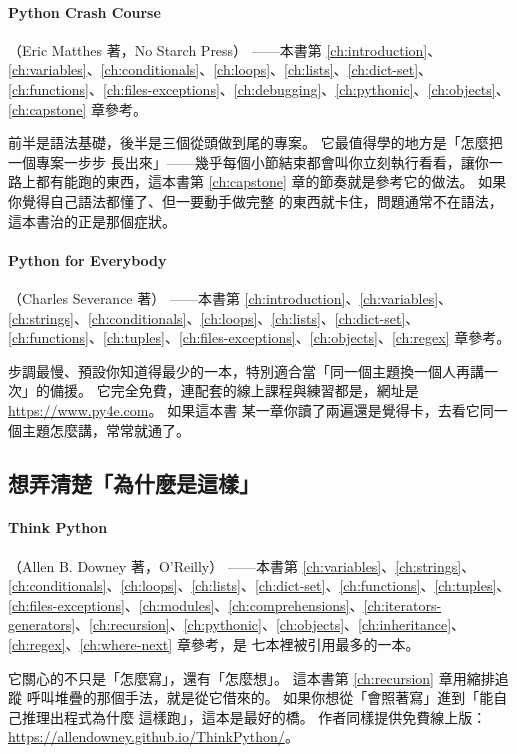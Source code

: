 \paragraph{Python Crash Course}（Eric Matthes 著，No Starch Press）
——本書第 \ref{ch:introduction}、\ref{ch:variables}、\ref{ch:conditionals}、\ref{ch:loops}、\ref{ch:lists}、\ref{ch:dict-set}、\ref{ch:functions}、\ref{ch:files-exceptions}、\ref{ch:debugging}、\ref{ch:pythonic}、\ref{ch:objects}、\ref{ch:capstone} 章參考。

前半是語法基礎，後半是三個從頭做到尾的專案。 它最值得學的地方是「怎麼把一個專案一步步
長出來」——幾乎每個小節結束都會叫你立刻執行看看，讓你一路上都有能跑的東西，這本書第
\ref{ch:capstone} 章的節奏就是參考它的做法。 如果你覺得自己語法都懂了、但一要動手做完整
的東西就卡住，問題通常不在語法，這本書治的正是那個症狀。

\paragraph{Python for Everybody}（Charles Severance 著）
——本書第 \ref{ch:introduction}、\ref{ch:variables}、\ref{ch:strings}、\ref{ch:conditionals}、\ref{ch:loops}、\ref{ch:lists}、\ref{ch:dict-set}、\ref{ch:functions}、\ref{ch:tuples}、\ref{ch:files-exceptions}、\ref{ch:objects}、\ref{ch:regex} 章參考。

步調最慢、預設你知道得最少的一本，特別適合當「同一個主題換一個人再講一次」的備援。
它完全免費，連配套的線上課程與練習都是，網址是 \url{https://www.py4e.com}。 如果這本書
某一章你讀了兩遍還是覺得卡，去看它同一個主題怎麼講，常常就通了。

\subsection*{想弄清楚「為什麼是這樣」}

\paragraph{Think Python}（Allen B. Downey 著，O'Reilly）
——本書第 \ref{ch:variables}、\ref{ch:strings}、\ref{ch:conditionals}、\ref{ch:loops}、\ref{ch:lists}、\ref{ch:dict-set}、\ref{ch:functions}、\ref{ch:tuples}、\ref{ch:files-exceptions}、\ref{ch:modules}、\ref{ch:comprehensions}、\ref{ch:iterators-generators}、\ref{ch:recursion}、\ref{ch:pythonic}、\ref{ch:objects}、\ref{ch:inheritance}、\ref{ch:regex}、\ref{ch:where-next} 章參考，是
七本裡被引用最多的一本。

它關心的不只是「怎麼寫」，還有「怎麼想」。 這本書第 \ref{ch:recursion} 章用縮排追蹤
呼叫堆疊的那個手法，就是從它借來的。 如果你想從「會照著寫」進到「能自己推理出程式為什麼
這樣跑」，這本是最好的橋。 作者同樣提供免費線上版：
\url{https://allendowney.github.io/ThinkPython/}。

